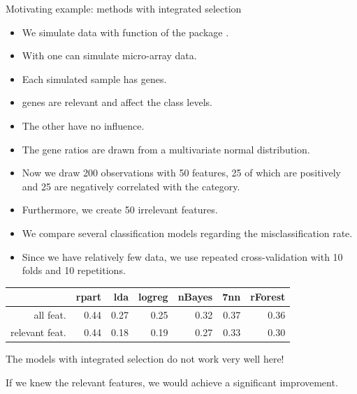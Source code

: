 \documentclass[11pt,compress,t,notes=noshow, xcolor=table]{beamer}
\begin{document}
  \begin{vbframe}{Motivating example: methods with integrated selection}

  \begin{itemize}
  \item We simulate data with function  of the package .
  \item With  one can simulate micro-array data.
  \item Each simulated sample has  genes.
  \item {} genes are relevant and affect the class levels.
  \item The other  have no influence.
  \item The gene ratios are drawn from a multivariate normal distribution.
  \end{itemize}

  \framebreak

  \begin{itemize}
  \item Now we draw 200 observations with 50 features, 25 of which are positively and 25 are negatively correlated with the category.
  \item Furthermore, we create 50 irrelevant features.
  \item We compare several classification models regarding the misclassification rate.
  \item Since we have relatively few data, we use repeated cross-validation with 10 folds and 10 repetitions.
  \end{itemize}

  \begin{table}[ht]
    \begin{center}
      \begin{tabular}{rrrrrrr}
        \hline
        & rpart & lda & logreg & nBayes & 7nn  & rForest \\
        \hline
        all feat. & 0.44 & 0.27 & 0.25 & 0.32 & 0.37 & 0.36 \\
        relevant feat. & 0.44 & 0.18 & 0.19 & 0.27 & 0.33 & 0.30 \\
        \hline
      \end{tabular}
    \end{center}
  \end{table}

  The models with integrated selection do not work very well here!

  If we knew the relevant features, we would achieve a significant improvement.
  \end{vbframe}
\end{document}
